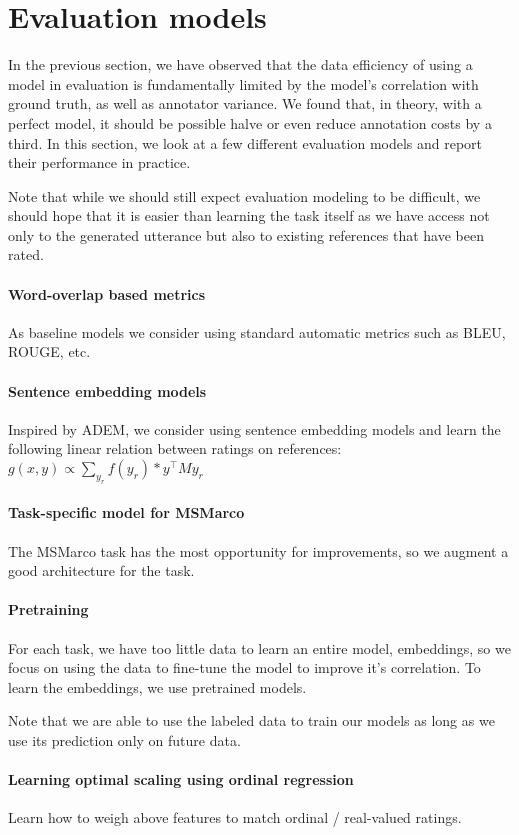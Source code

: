 \section{\label{sec:models} Evaluation models}
In the previous section, we have observed that the data efficiency of using a model in evaluation is fundamentally limited by the model's correlation with ground truth, as well as annotator variance.
We found that, in theory, with a perfect model, it should be possible halve or even reduce annotation costs by a third.
In this section, we look at a few different evaluation models and report their performance in practice.

Note that while we should still expect evaluation modeling to be difficult, we should hope that it is easier than learning the task itself as we have access not only to the generated utterance but also to existing references that have been rated.

\paragraph{Word-overlap based metrics}
As baseline models we consider using standard automatic metrics such as BLEU, ROUGE, etc.

\paragraph{Sentence embedding models}
Inspired by ADEM, we consider using sentence embedding models and learn the following linear relation between ratings on references:
$g(x,y) \propto \sum_{y_r} f(y_r) * y^\top M y_r$

\paragraph{Task-specific model for MSMarco}
The MSMarco task has the most opportunity for improvements, so we augment a good architecture for the task.

\paragraph{Pretraining}
For each task, we have too little data to learn an entire model, embeddings, so we focus on using the data to fine-tune the model to improve it's correlation. 
To learn the embeddings, we use pretrained models.

Note that we are able to use the labeled data to train our models as long as we use its prediction only on future data. 

\paragraph{Learning optimal scaling using ordinal regression}
Learn how to weigh above features to match ordinal / real-valued ratings.
